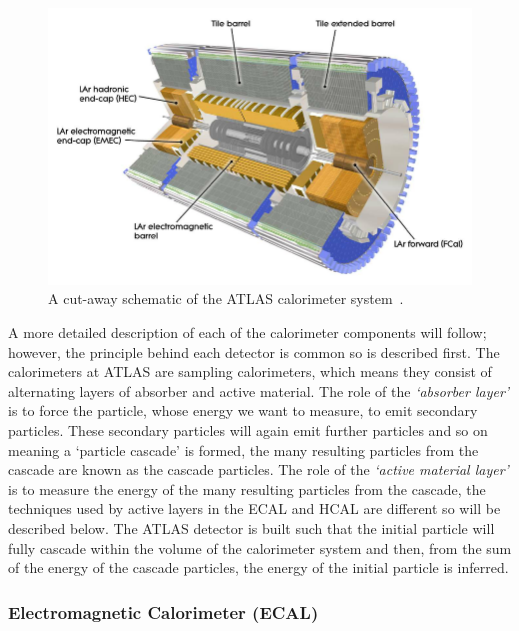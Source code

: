 \begin{figure}[!ht]
  \begin{center}
    \includegraphics[width=1\linewidth, angle=0]{figs/Detector/Calo_schem.png}
  \end{center}
  \caption[A cut-away schematic of the ATLAS calorimeter system.]
          {A cut-away schematic of the ATLAS calorimeter system~\cite{det-ATLAS_Exp}.}
  \label{fig:det-calo_schem}
\end{figure}

A more detailed description of each of the calorimeter components will follow;
however, the principle behind each detector is common so is described first.
The calorimeters at ATLAS are sampling calorimeters, which means they consist of alternating layers of absorber and active material.
The role of the \textit{`absorber layer'} is to force the particle, whose energy we want to measure, to emit secondary particles.
These secondary particles will again emit further particles and so on meaning a `particle cascade' is formed,
the many resulting particles from the cascade are known as the cascade particles.
The role of the \textit{`active material layer'} is to measure the energy of the many resulting particles from the cascade,
the techniques used by active layers in the ECAL and HCAL are different so will be described below.
The ATLAS detector is built such that the initial particle will fully cascade within the volume of the calorimeter system
and then, from the sum of the energy of the cascade particles, the energy of the initial particle is inferred. 

\subsubsection{Electromagnetic Calorimeter (ECAL)}

